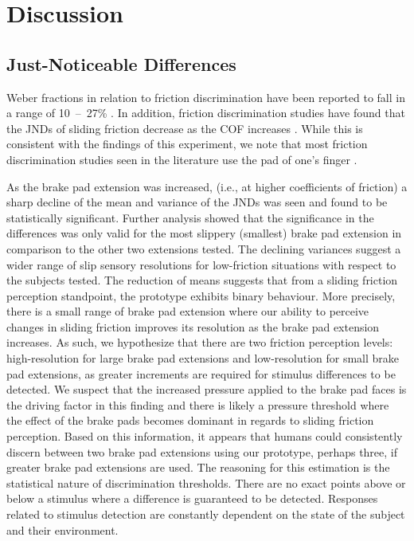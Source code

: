 \documentclass [12pt,letterpaper]{report}
\begin{document}
\section{Discussion}

\subsection{Just-Noticeable Differences}


Weber fractions in relation to friction discrimination have been reported to fall in a range of 10~--~27\% \cite{jones2013application}. In addition, friction discrimination studies have found that the JNDs of sliding friction decrease as the COF increases \cite{provancher2009fingerpad}. While this is consistent with the findings of this experiment, we note that most friction discrimination studies seen in the literature use the pad of one's finger \cite{provancher2009fingerpad,samur2009psychophysical,bau2010teslatouch}.

As the brake pad extension was increased, (i.e., at higher coefficients of friction) a sharp decline of the mean and variance of the JNDs was seen and found to be statistically significant. Further analysis showed that the significance in the differences was only valid for the most slippery (smallest) brake pad extension in comparison to the other two extensions tested. The declining variances suggest a wider range of slip sensory resolutions for low-friction situations with respect to the subjects tested. The reduction of means suggests that from a sliding friction perception standpoint, the prototype exhibits binary behaviour. More precisely, there is a small range of brake pad extension where our ability to perceive changes in sliding friction improves its resolution as the brake pad extension increases. As such, we hypothesize that there are two friction perception levels: high-resolution for large brake pad extensions and low-resolution for small brake pad extensions, as greater increments are required for stimulus differences to be detected. We suspect that the increased pressure applied to the brake pad faces is the driving factor in this finding and there is likely a pressure threshold where the effect of the brake pads becomes dominant in regards to sliding friction perception. Based on this information, it appears that humans could consistently discern between two brake pad extensions using our prototype, perhaps three, if greater brake pad extensions are used. The reasoning for this estimation is the statistical nature of discrimination thresholds. There are no exact points above or below a stimulus where a difference is guaranteed to be detected. Responses related to stimulus detection are constantly dependent on the state of the subject and their environment.
\end{document}
